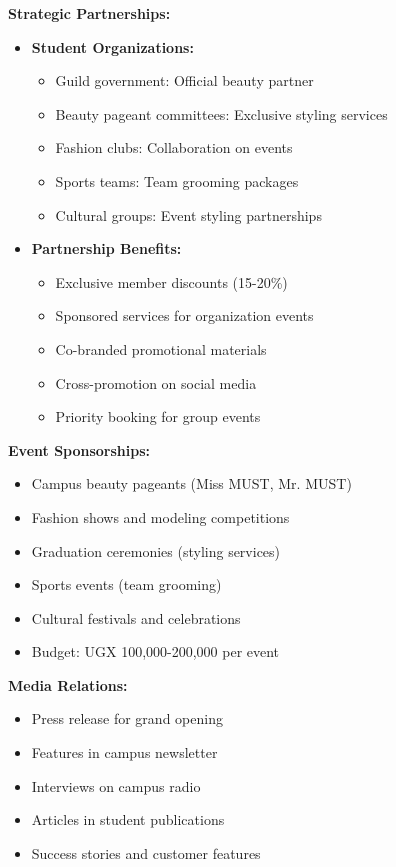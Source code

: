 \textbf{Strategic Partnerships:}
\begin{itemize}[leftmargin=2em]
    \item \textbf{Student Organizations:}
    \begin{itemize}
        \item Guild government: Official beauty partner
        \item Beauty pageant committees: Exclusive styling services
        \item Fashion clubs: Collaboration on events
        \item Sports teams: Team grooming packages
        \item Cultural groups: Event styling partnerships
    \end{itemize}
    
    \item \textbf{Partnership Benefits:}
    \begin{itemize}
        \item Exclusive member discounts (15-20\%)
        \item Sponsored services for organization events
        \item Co-branded promotional materials
        \item Cross-promotion on social media
        \item Priority booking for group events
    \end{itemize}
\end{itemize}

\textbf{Event Sponsorships:}
\begin{itemize}[leftmargin=2em]
    \item Campus beauty pageants (Miss MUST, Mr. MUST)
    \item Fashion shows and modeling competitions
    \item Graduation ceremonies (styling services)
    \item Sports events (team grooming)
    \item Cultural festivals and celebrations
    \item Budget: UGX 100,000-200,000 per event
\end{itemize}

\textbf{Media Relations:}
\begin{itemize}[leftmargin=2em]
    \item Press release for grand opening
    \item Features in campus newsletter
    \item Interviews on campus radio
    \item Articles in student publications
    \item Success stories and customer features
\end{itemize}

